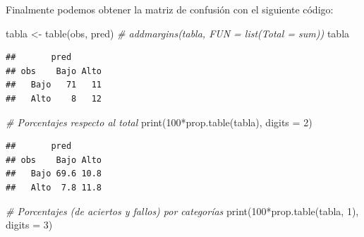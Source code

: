 \documentclass[
  spanish,
]{book}
\newenvironment{Shaded}{\begin{snugshade}}{\end{snugshade}}
\newcommand{\AttributeTok}[1]{\textcolor[rgb]{0.77,0.63,0.00}{#1}}
\newcommand{\CommentTok}[1]{\textcolor[rgb]{0.56,0.35,0.01}{\textit{#1}}}
\newcommand{\DecValTok}[1]{\textcolor[rgb]{0.00,0.00,0.81}{#1}}
\newcommand{\FloatTok}[1]{\textcolor[rgb]{0.00,0.00,0.81}{#1}}
\newcommand{\FunctionTok}[1]{\textcolor[rgb]{0.00,0.00,0.00}{#1}}
\newcommand{\NormalTok}[1]{#1}
\newcommand{\OtherTok}[1]{\textcolor[rgb]{0.56,0.35,0.01}{#1}}
\newcommand{\SpecialCharTok}[1]{\textcolor[rgb]{0.00,0.00,0.00}{#1}}
\newcommand{\StringTok}[1]{\textcolor[rgb]{0.31,0.60,0.02}{#1}}
\theoremstyle{break}
\theoremstyle{definition}
\theoremstyle{definition}
\theoremstyle{definition}
\theoremstyle{definition}
\theoremstyle{remark}
\begin{document}
\begin{Shaded}
\end{Shaded}

Finalmente podemos obtener la matriz de confusión con el siguiente código:

\begin{Shaded}
\begin{Highlighting}[]
\NormalTok{tabla }\OtherTok{\textless{}{-}} \FunctionTok{table}\NormalTok{(obs, pred)}
\CommentTok{\# addmargins(tabla, FUN = list(Total = sum))}
\NormalTok{tabla}
\end{Highlighting}
\end{Shaded}

\begin{verbatim}
##       pred
## obs    Bajo Alto
##   Bajo   71   11
##   Alto    8   12
\end{verbatim}

\begin{Shaded}
\begin{Highlighting}[]
\CommentTok{\# Porcentajes respecto al total}
\FunctionTok{print}\NormalTok{(}\DecValTok{100}\SpecialCharTok{*}\FunctionTok{prop.table}\NormalTok{(tabla), }\AttributeTok{digits =} \DecValTok{2}\NormalTok{) }
\end{Highlighting}
\end{Shaded}

\begin{verbatim}
##       pred
## obs    Bajo Alto
##   Bajo 69.6 10.8
##   Alto  7.8 11.8
\end{verbatim}

\begin{Shaded}
\begin{Highlighting}[]
\CommentTok{\# Porcentajes (de aciertos y fallos) por categorías}
\FunctionTok{print}\NormalTok{(}\DecValTok{100}\SpecialCharTok{*}\FunctionTok{prop.table}\NormalTok{(tabla, }\DecValTok{1}\NormalTok{), }\AttributeTok{digits =} \DecValTok{3}\NormalTok{) }
\end{Highlighting}
\end{Shaded}
\end{document}
